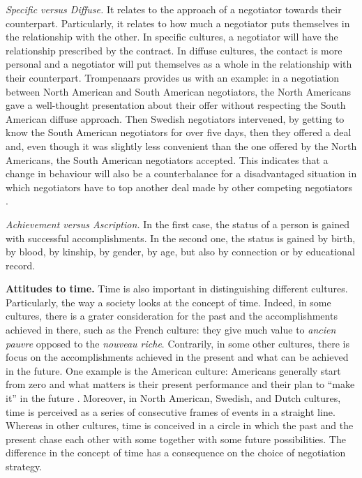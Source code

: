 \documentclass[../main.tex]{subfiles}
\begin{document}
\textit{Specific versus Diffuse.} It relates to the approach of a negotiator towards their counterpart. Particularly, it relates to how much a negotiator puts themselves in the relationship with the other. In specific cultures, a negotiator will have the relationship prescribed by the contract. In diffuse cultures, the contact is more personal and a negotiator will put themselves as a whole in the relationship with their counterpart. Trompenaars provides us with an example: in a negotiation between North American and South American negotiators, the North Americans gave a well-thought presentation about their offer without respecting the South American diffuse approach. Then Swedish negotiators intervened, by getting to know the South American negotiators for over five days, then they offered a deal and, even though it was slightly less convenient than the one offered by the North Americans, the South American negotiators accepted. This indicates that a change in behaviour will also be a counterbalance for a disadvantaged situation in which negotiators have to top another deal made by other competing negotiators \mancite\autocite[9]{trompenaars}.

\textit{Achievement versus Ascription.} In the first case, the status of a person is gained with successful accomplishments. In the second one, the status is gained by birth, by blood, by kinship, by gender, by age, but also by connection or by educational record.

\textbf{Attitudes to time.} Time is also important in distinguishing different cultures. Particularly, the way a society looks at the concept of time. Indeed, in some cultures, there is a grater consideration for the past and the accomplishments achieved in there, such as the French culture: they give much value to \textit{ancien pauvre} opposed to the \textit{nouveau riche}. Contrarily, in some other cultures, there is focus on the accomplishments achieved in the present and what can be achieved in the future. One example is the American culture: Americans generally start from zero and what matters is their present performance and their plan to “make it” in the future \mancite\autocite[10]{trompenaars}. Moreover, in North American, Swedish, and Dutch cultures, time is perceived as a series of consecutive frames of events in a straight line. Whereas in other cultures, time is conceived in a circle in which the past and the present chase each other with some together with some future possibilities. The difference in the concept of time has a consequence on the choice of negotiation strategy. 
\end{document}
